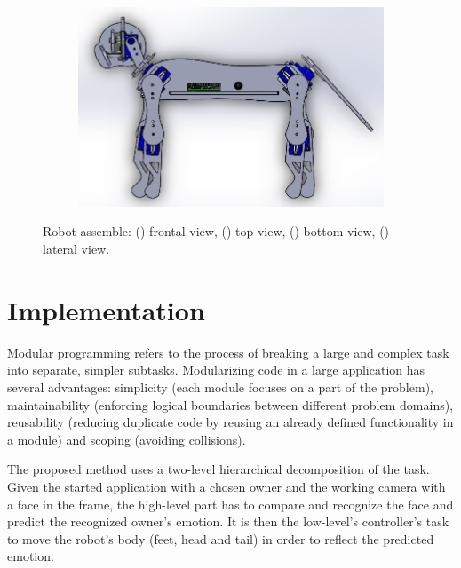 \documentclass[runningheads,a4paper,12pt]{report}
\begin{document}
\begin{figure}[H]
  	\begin{subfigure}{0.5\textwidth}
  		\centering
  		\includegraphics[width=\linewidth]{./images/3_hard_lateral}
  		\caption{}
  		\label{fig:3_lateral}
  	\end{subfigure}
  	\caption{Robot assemble: 
  		() frontal view,
  		() top view,
  		() bottom view,
  		() lateral view.
  		}
  	\label{fig:3_hardware2}
\end{figure}

\newpage

\section{Implementation}
\label{chapter:implementation}

Modular programming refers to the process of breaking a large and complex task into separate, simpler subtasks. Modularizing code in a large application has several advantages: simplicity (each module focuses on a part of the problem), maintainability (enforcing logical boundaries between different problem domains), reusability (reducing duplicate code by reusing an already defined functionality in a module) and scoping (avoiding collisions). 

The proposed method uses a two-level hierarchical decomposition of the task. Given the started application with a chosen owner and the working camera with a face in the frame, the high-level part has to compare and recognize the face and predict the recognized owner's emotion. It is then the low-level's controller's task to move the robot's body (feet, head and tail) in order to reflect the predicted emotion. 
\end{document}
